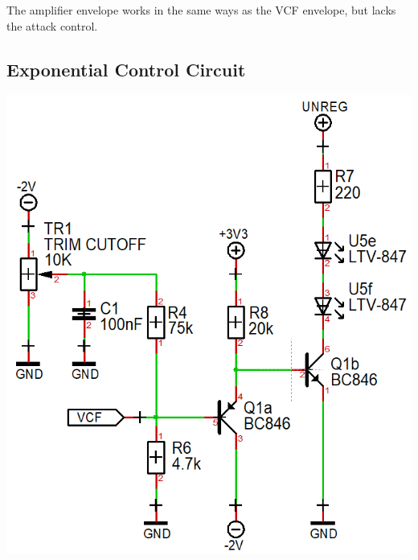\documentclass{scrartcl}
\begin{document}
The amplifier envelope works in the same ways as the VCF envelope, but lacks the attack control.

\subsection{Exponential Control Circuit}

\begin{center}
    \includegraphics[scale=0.40]{assets/schema-expo-vcf.png}

\end{center}
\end{document}
